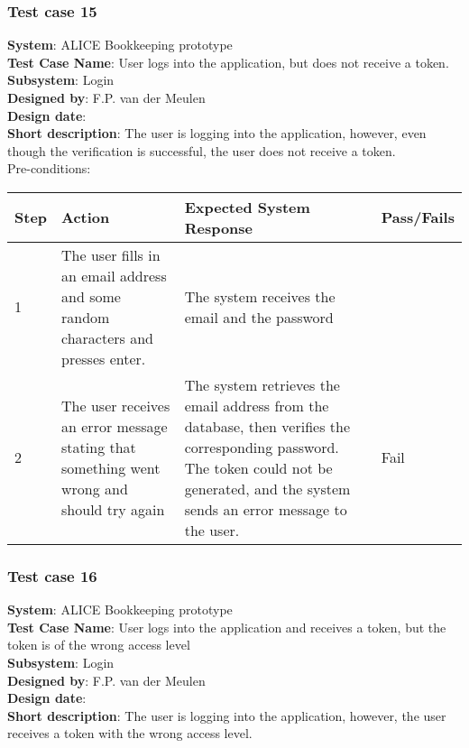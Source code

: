 \subsubsection{Test case 15}
\textbf{System}:  ALICE Bookkeeping prototype \\
\textbf{Test Case Name}:  User logs into the application, but does not receive a token. \\
\textbf{Subsystem}:  Login \\
\textbf{Designed by}:  F.P. van der Meulen\\
\textbf{Design date}:  \\
\textbf{Short description}: The user is logging into the application, however, even though the verification is successful, the user does not receive a token. \\

Pre-conditions: \\

\begin{longtable}{ | p{0.8cm} | p{4.5cm} | p{6cm} | p{1.5cm} |}
\hline
Step & Action & Expected System Response & Pass/Fails  \\ \hline
1 & The user fills in an email address and some random characters and presses enter. & The system receives the email and the password &  \\ \hline
2 & The user receives an error message stating that something went wrong and should try again & The system retrieves the email address from the database, then verifies the corresponding password.  The token could not be generated, and the system sends an error message to the user. & Fail \\ \hline
\end{longtable}

\subsubsection{Test case 16}
\textbf{System}:  ALICE Bookkeeping prototype \\
\textbf{Test Case Name}:  User logs into the application and receives a token, but the token is of the wrong access level \\
\textbf{Subsystem}:  Login \\
\textbf{Designed by}:  F.P. van der Meulen\\
\textbf{Design date}:  \\
\textbf{Short description}: The user is logging into the application, however, the user receives a token with the wrong access level. \\

